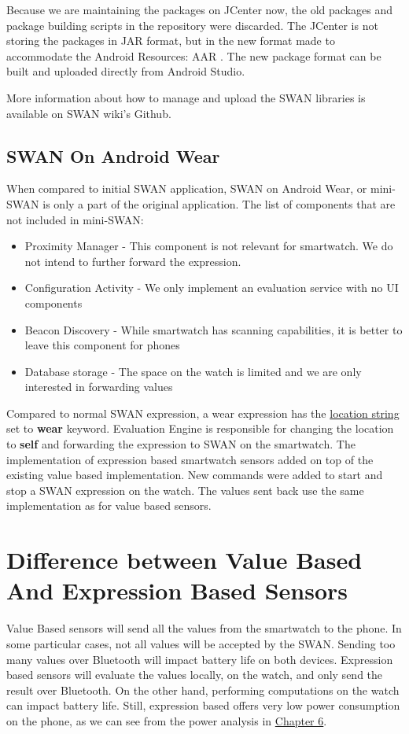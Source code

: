 Because we are maintaining the packages on JCenter now, the old packages and package building scripts  in the repository were discarded.
The JCenter  is not storing the packages in JAR format, but in the new format made to accommodate the Android Resources: AAR \cite{aar_format}. 
The new package format can be built and uploaded directly from Android Studio. 

More information about how to manage and upload the SWAN libraries is available on SWAN wiki's Github\cite{swanWiki}.

\subsection{SWAN On Android Wear}
When compared to initial SWAN application, SWAN on Android Wear, or mini-SWAN is only a part of the original application.
The list of components that are not included in mini-SWAN:
\begin{itemize}
 \item Proximity Manager - This component is not relevant for smartwatch. We do not intend to further forward the expression.
 \item Configuration Activity - We only implement an evaluation service with no UI components
 \item Beacon Discovery - While smartwatch has scanning capabilities, it is better to leave this component for phones
 \item Database storage - The space on the watch is limited and we are only interested in forwarding values
\end{itemize}

Compared to normal SWAN expression, a wear expression has the \hyperref[fig:SwanExpression]{location string} set to \textbf{wear} keyword. Evaluation Engine is responsible for changing the location
to \textbf{self} and forwarding the expression to SWAN on the smartwatch.
The implementation of expression based smartwatch sensors added on top of the existing value based implementation. New commands were added to start and stop a SWAN expression on the watch.
The values sent back use the same implementation as for value based sensors.

\section{Difference between Value Based And Expression Based Sensors}
Value Based sensors will send all the values from the smartwatch to the phone. In some particular cases, not all values will be accepted by the SWAN.
Sending too many values over Bluetooth will impact battery life on both devices.
Expression based sensors will evaluate the values locally, on the watch, and only send the result over Bluetooth. On the other hand, performing
computations on the watch can impact battery life. Still, expression based offers very low power consumption on the phone, as we can see from the power analysis in \hyperref[Chapter6]{Chapter 6}.
